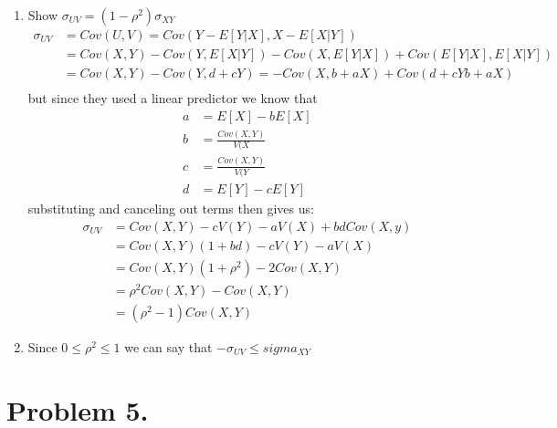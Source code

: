 \documentclass{article}
\newcommand{\1}{\mathbf{1}}
\begin{document}
\begin{enumerate}
    \item Show $\sigma_{UV} = (1 - \rho^2)\sigma_{XY}$
        \begin{align*}
            \sigma_{UV} &= Cov(U,V) = Cov(Y - E[Y|X], X-E[X|Y]) \\
            &= Cov(X, Y) - Cov(Y, E[X|Y]) - Cov(X, E[Y|X]) + Cov(E[Y|X], E[X|Y]) \\
            &= Cov(X,Y) - Cov(Y, d+cY) = - Cov(X, b+aX) + Cov(d+cY b+aX) \\
        \end{align*}
    but since they used a linear predictor we know that 
        \begin{align*}
            a &= E[X] - bE[X] \\
            b &=  \frac{Cov(X,Y)}{V(X} \\
            c &= \frac{Cov(X,Y)}{V(Y} \\
            d &= E[Y] - cE[Y]
        \end{align*}
    substituting and canceling out terms then gives us:
        \begin{align*}
            \sigma_{UV} &= Cov(X,Y) - cV(Y) - aV(X) + bdCov(X,y) \\
            &= Cov(X,Y)(1+bd) - cV(Y) - aV(X) \\
            &= Cov(X,Y)(1+\rho^2) - 2Cov(X,Y) \\
            &= \rho^2 Cov(X,Y) - Cov(X, Y) \\
            &= (\rho^2-1) Cov(X, Y)
        \end{align*}
        
    \item Since $0 \leq \rho^2 \leq 1$ we can say that $-\sigma_{UV} \leq sigma_{XY}$
\end{enumerate}


\newpage
\section*{Problem 5.} 
\end{document}

